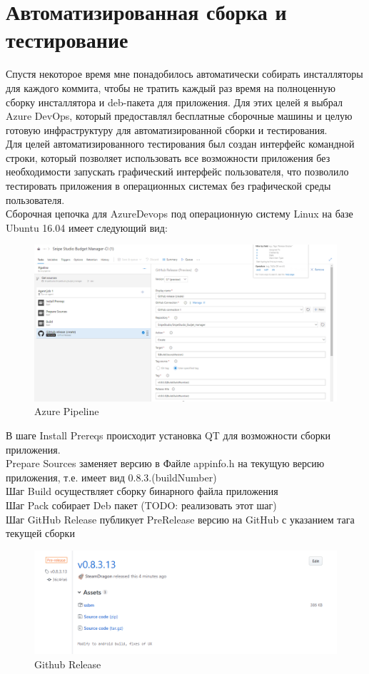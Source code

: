 \section{Автоматизированная сборка и тестирование}
Спустя некоторое время мне понадобилось автоматически собирать инсталляторы для каждого коммита, чтобы не тратить каждый раз время на полноценную сборку инсталлятора и deb-пакета для приложения. Для этих целей я выбрал Azure DevOps, который предоставлял бесплатные сборочные машины и целую готовую инфраструктуру для автоматизированной сборки и тестирования.\\
Для целей автоматизированного тестирования был создан интерфейс командной строки, который позволяет использовать все возможности приложения без необходимости запускать графический интерфейс пользователя, что позволило тестировать приложения в операционных системах без графической среды пользователя.\\
Сборочная цепочка для AzureDevops под операционную систему Linux на базе Ubuntu 16.04 имеет следующий вид:
\begin{figure}[H]
	\centering
	\includegraphics[width=1\linewidth]{pics/AzurePipeline.PNG}
	\caption{Azure Pipeline}
	\label{fig:AzurePipeline}
\end{figure}

В шаге Install Prereqs происходит установка QT для возможности сборки приложения.\\
Prepare Sources заменяет версию в Файле appinfo.h на текущую версию приложения, т.е. имеет вид 0.8.3.(buildNumber)\\
Шаг Build осуществляет сборку бинарного файла приложения\\
Шаг Pack собирает Deb пакет (TODO: реализовать этот шаг)\\
Шаг GitHub Release публикует PreRelease версию на GitHub с указанием тага текущей сборки\\
\begin{figure}[H]
	\centering
	\includegraphics[width=1\linewidth]{pics/GHRelease.PNG}
	\caption{Github Release}
	\label{fig:GHRelease}
\end{figure}

